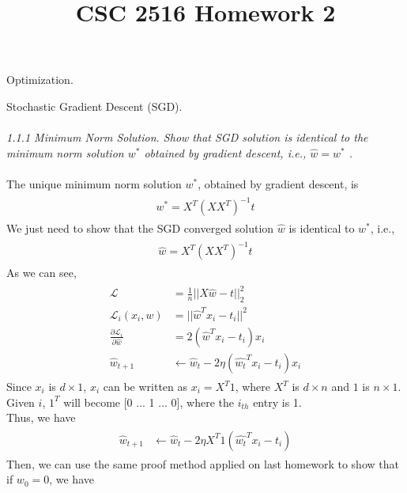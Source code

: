 \documentclass{myhw}
\title{CSC 2516 Homework 2}
\begin{document}
\begin{homeworkProblem}
Optimization.
\begin{homeworkSection}
Stochastic Gradient Descent (SGD). \\ \\
\emph{1.1.1 Minimum Norm Solution. Show that SGD solution is identical to the minimum norm solution $w^*$ obtained by gradient descent, i.e., $\hat{w} = w^*$ .} \\
\\
The unique minimum norm solution $w^*$, obtained by gradient descent, is
\begin{gather*}
\begin{aligned}
w^* = X^T(XX^T)^{-1}t
\end{aligned}
\end{gather*}
We just need to show that the SGD converged solution $\hat{w}$ is identical to $w^*$, i.e., 
\begin{gather*}
\begin{aligned}
\hat{w} = X^T(XX^T)^{-1}t
\end{aligned}
\end{gather*}
As we can see,
\begin{gather*}
\begin{aligned}
\mathcal{L} &= \frac{1}{n} || X \hat{w} - t ||_2^2 \\
\mathcal{L}_i(x_i, w) &= || \hat{w}^T x_i - t_i ||^2 \\
\frac{\partial \mathcal{L}_i}{\partial \hat{w}} &= 2(\hat{w}^T x_i - t_i) x_i \\
\hat{w}_{t+1} &\leftarrow \hat{w}_t - 2 \eta (\hat{w_t}^T x_i - t_i) x_i
\end{aligned}
\end{gather*}
Since $x_i$ is $d \times 1$, $x_i$ can be written as $x_i = X^T \mathit{1}$, where $X^T$ is $d \times n$ and $\mathit{1}$ is $n \times 1$. \\
Given $i$, $\mathit{1}^T$ will become [0 ... 1 ... 0], where the $i_{th}$ entry is 1. \\
Thus, we have
\begin{gather*}
\begin{aligned}
\hat{w}_{t+1} &\leftarrow \hat{w}_t - 2 \eta X^T \mathit{1} (\hat{w_t}^T x_i - t_i)
\end{aligned}
\end{gather*}
Then, we can use the same proof method applied on last homework to show that if 
$w_0 = 0$, we have
\begin{gather*}

\end{gather*}
\end{homeworkSection}
\end{homeworkProblem}
\end{document}
